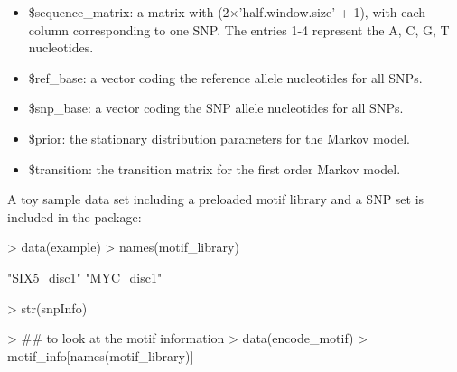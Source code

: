\documentclass[a4paper,10pt]{article}
\begin{document}
\begin{itemize}
\item \$sequence\_matrix: a matrix with (2$\times$'half.window.size' + 1), with each column corresponding to one SNP. The entries 1-4 represent the A, C, G, T nucleotides.
\item \$ref\_base: a vector coding the reference allele nucleotides for all SNPs.
\item \$snp\_base: a vector coding the SNP allele nucleotides for all SNPs.
\item \$prior: the stationary distribution parameters for the Markov model.
\item \$transition: the transition matrix for the first order Markov model.
\end{itemize}

A toy sample data set including a preloaded motif library and a SNP set is included in the package:

\begin{Schunk}
\begin{Sinput}
> data(example)
> names(motif_library)
\end{Sinput}
\begin{Soutput}
[1] "SIX5_disc1" "MYC_disc1" 
\end{Soutput}
\begin{Sinput}
> str(snpInfo)
\end{Sinput}
\begin{Sinput}
> ## to look at the motif information
> data(encode_motif)
> motif_info[names(motif_library)]
\end{Sinput}
\end{Schunk}
\end{document}

